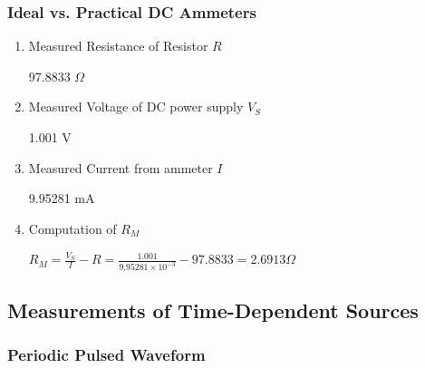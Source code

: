 \documentclass[12pt]{article}
\begin{document}
\subsubsection{Ideal vs. Practical DC Ammeters}
\begin{enumerate}
\item Measured Resistance of Resistor $R$

97.8833 $\Omega$

\item Measured Voltage of DC power supply $V_S$

1.001 V

\item Measured Current from ammeter $I$

9.95281 mA

\item Computation of $R_M$

$R_M = \frac{V_S}{I} - R = \frac{1.001}{9.95281 \times 10^{-3}} - 97.8833 = 2.6913 \Omega$

\end{enumerate}

\subsection{Measurements of Time-Dependent Sources}

\subsubsection{Periodic Pulsed Waveform}
\end{document}
